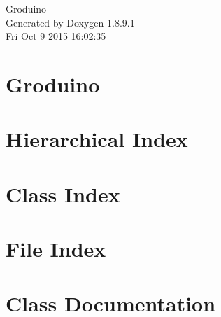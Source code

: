 \documentclass[twoside]{book}
\newcommand{\+}{\discretionary{\mbox{\scriptsize$\hookleftarrow$}}{}{}}
\newcommand{\clearemptydoublepage}{%
  \newpage{\pagestyle{empty}\cleardoublepage}%
}
\begin{document}
\hypersetup{pageanchor=false,
             bookmarks=true,
             bookmarksnumbered=true,
             pdfencoding=unicode
            }
\begin{titlepage}
\vspace*{7cm}
\begin{center}%
{\Large Groduino }\\
\vspace*{1cm}
{\large Generated by Doxygen 1.8.9.1}\\
\vspace*{0.5cm}
{\small Fri Oct 9 2015 16:02:35}\\
\end{center}
\end{titlepage}
\clearemptydoublepage
\tableofcontents
\clearemptydoublepage
{}
\hypersetup{pageanchor=true}

\chapter{Groduino}
\label{index}\hypertarget{index}{}
\chapter{Hierarchical Index}

\chapter{Class Index}

\chapter{File Index}

\chapter{Class Documentation}













\end{document}
